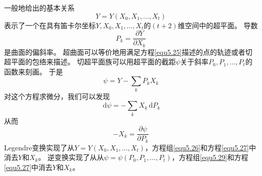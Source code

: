 一般地给出的基本关系
\begin{equation}
\label{equ5.25}
  Y=Y(X_0,X_1,\dots,X_t)
\end{equation}
表示了一个在具有笛卡尔坐标$Y,X_0,X_1,\dots,X_t$的$(t+2)$维空间中的超平面。
导数
\begin{equation}
\label{equ5.26}
  P_k=\frac{\partial Y}{\partial X_k}
\end{equation}
是曲面的偏斜率。
超曲面可以等价地用满足方程\eqref{equ5.25}描述的点的轨迹或者切超平面的包络来描述。
切超平面族可以用超平面的截距$\psi$关于斜率$P_0,P_1,\dots,P_t$的函数来刻画。
于是
\begin{equation}
\label{equ5.27}
  \psi=Y-\sum_kP_kX_k
\end{equation}
对这个方程求微分，我们可以发现
\begin{equation}
\label{equ5.28}
  \,\mathrm d\psi=-\sum_kX_k\,\mathrm dP_k
\end{equation}
从而
\begin{equation}
\label{equ5.29}
	-X_k = \frac{\partial \psi}{\partial P_k}
\end{equation}
Legendre变换实现了从$Y=Y(X_0,X_1,\dots,X_t)$，方程组\eqref{equ5.26}和方程\eqref{equ5.27}中消去$Y$和$X_k$。
逆变换实现了从从$\psi=\psi(P_0,P_1,\dots,P_t)$，方程组\eqref{equ5.29}和方程\eqref{equ5.27}中消去$Y$和$X_k$。

